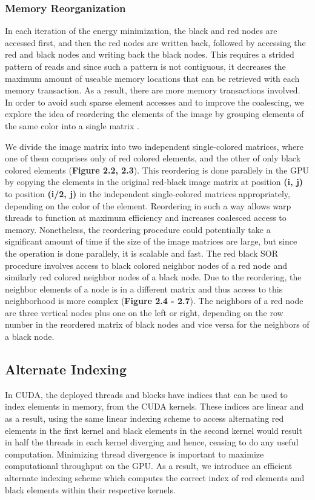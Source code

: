 \documentclass[english]{article}
\begin{document}
	\subsubsection{Memory Reorganization}
	In each iteration of the energy minimization, the black and red nodes are accessed first, and then the red nodes are written back, followed by accessing the red and black nodes and writing back the black nodes. This requires a strided pattern of reads and since such a pattern is not contiguous, it decreases the maximum amount of useable memory locations that can be retrieved with each memory transaction. As a result, there are more memory transactions involved. In order to avoid such sparse element accesses and to improve the coalescing, we explore the idea of reordering the elements of the image by grouping elements of the same color into a single matrix \cite{2}.\newline

	We divide the image matrix into two independent single-colored matrices, where one of them comprises only of red colored elements, and the other of only black colored elements (\textbf{Figure 2.2, 2.3}). This reordering is done parallely in the GPU by copying the elements in the original red-black image matrix at position \textbf{(i, j)} to position \textbf{(i/2, j)} in the independent single-colored matrices appropriately, depending on the color of the element. Reordering in such a way allows warp threads to function at maximum efficiency and increases coalesced access to memory. Nonetheless, the reordering procedure could potentially take a significant amount of time if the size of the image matrices are large, but since the operation is done parallely, it is scalable and fast. The red black SOR procedure involves access to black colored neighbor nodes of a red node and similarly red colored neighbor nodes of a black node. Due to the reordering, the neighbor elements of a node is in a different matrix and thus access to this neighborhood is more complex (\textbf{Figure 2.4 - 2.7}). The neighbors of a red node are three vertical nodes plus one on the left or right, depending on the row number in the reordered matrix of black nodes and vice versa for the neighbors of a black node.

	\subsection{Alternate Indexing}
	In CUDA, the deployed threads and blocks have indices that can be used to index elements in memory, from the CUDA kernels. These indices are linear and as a result, using the same linear indexing scheme to access alternating red elements in the first kernel and black elements in the second kernel would result in half the threads in each kernel diverging and hence, ceasing to do any useful computation. Minimizing thread divergence is important to maximize computational throughput on the GPU. As a result, we introduce an efficient alternate indexing scheme which computes the correct index of red elements and black elements within their respective kernels.\newline
\end{document}

